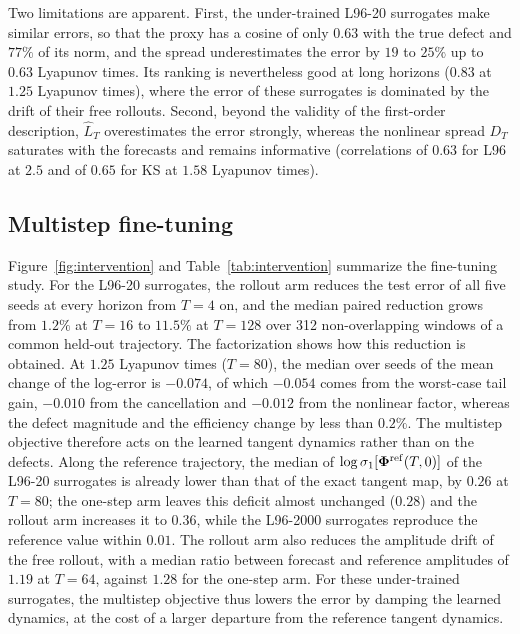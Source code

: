 Two limitations are apparent. First, the under-trained L96-20 surrogates make similar errors, so that the proxy has a cosine of only $0.63$ with the true defect and $77\%$ of its norm, and the spread underestimates the error by $19$ to $25\%$ up to $0.63$ Lyapunov times. Its ranking is nevertheless good at long horizons ($0.83$ at $1.25$ Lyapunov times), where the error of these surrogates is dominated by the drift of their free rollouts. Second, beyond the validity of the first-order description, $\hat L_T$ overestimates the error strongly, whereas the nonlinear spread $D_T$ saturates with the forecasts and remains informative (correlations of $0.63$ for L96 at $2.5$ and of $0.65$ for KS at $1.58$ Lyapunov times).

\subsection{Multistep fine-tuning}
\label{sec:res_intervention}

Figure~\ref{fig:intervention} and Table~\ref{tab:intervention} summarize the fine-tuning study. For the L96-20 surrogates, the rollout arm reduces the test error of all five seeds at every horizon from $T=4$ on, and the median paired reduction grows from $1.2\%$ at $T=16$ to $11.5\%$ at $T=128$ over 312 non-overlapping windows of a common held-out trajectory. The factorization shows how this reduction is obtained. At $1.25$ Lyapunov times ($T=80$), the median over seeds of the mean change of the log-error is $-0.074$, of which $-0.054$ comes from the worst-case tail gain, $-0.010$ from the cancellation and $-0.012$ from the nonlinear factor, whereas the defect magnitude and the efficiency change by less than $0.2\%$. The multistep objective therefore acts on the learned tangent dynamics rather than on the defects. Along the reference trajectory, the median of $\log\sigma_1[\boldsymbol{\Phi}^{\rm ref}(T,0)]$ of the L96-20 surrogates is already lower than that of the exact tangent map, by $0.26$ at $T=80$; the one-step arm leaves this deficit almost unchanged ($0.28$) and the rollout arm increases it to $0.36$, while the L96-2000 surrogates reproduce the reference value within $0.01$. The rollout arm also reduces the amplitude drift of the free rollout, with a median ratio between forecast and reference amplitudes of $1.19$ at $T=64$, against $1.28$ for the one-step arm. For these under-trained surrogates, the multistep objective thus lowers the error by damping the learned dynamics, at the cost of a larger departure from the reference tangent dynamics.

